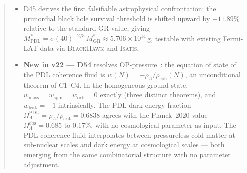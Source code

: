 \documentclass[11pt,a4paper]{article}
\theoremstyle{plain}
\theoremstyle{definition}
\theoremstyle{remark}
\newcommand{\rhocoh}{\rho_{\mathrm{coh}}}
\begin{document}
\begin{abstract}
\begin{itemize}
\item D45 derives the first falsifiable astrophysical confrontation: the primordial black hole survival threshold is shifted upward by $+11.89\%$ relative to the standard GR value, giving $M^*_{\mathrm{PDL}} = \sigma(40)^{-2/3}\,M^*_{\mathrm{GR}} \approx 5.706 \times 10^{14}$\,g, testable with existing Fermi-LAT data via \textsc{BlackHawk} and \textsc{Isatis}.
\item \textbf{New in v22 --- D54} resolves OP-pressure~\cite{D54}: the equation of state of the PDL coherence fluid is $w(N) = -\rho_\Lambda/\rhocoh(N)$, an unconditional theorem of C1--C4. In the homogeneous ground state, $w_{\mathrm{mass}} = w_{\mathrm{spin}} = w_{\mathrm{orb}} = 0$ exactly (three distinct theorems), and $w_{\mathrm{leak}} = -1$ intrinsically. The PDL dark-energy fraction $\Omega_\Lambda^{\mathrm{PDL}} = \rho_\Lambda/\rho_{\mathrm{crit}} = 0.6838$ agrees with the Planck~2020 value $\Omega_\Lambda^{\mathrm{obs}} = 0.685$ to $0.17\%$, with no cosmological parameter as input. The PDL coherence fluid interpolates between pressureless cold matter at sub-nuclear scales and dark energy at cosmological scales --- both emerging from the same combinatorial structure with no parameter adjustment.


\end{itemize}
\end{abstract}
\end{document}
